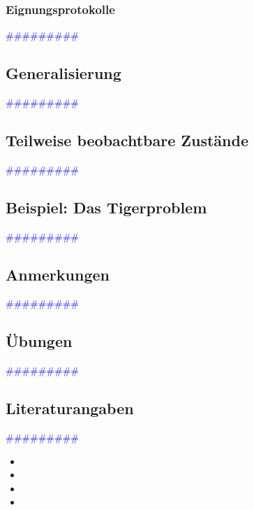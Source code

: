 \documentclass{article}
\begin{document}
    \subsubsection{Eignungsprotokolle} %
      \textcolor{blue}{\#\#\#\#\#\#\#\#\#}
  \subsection{Generalisierung} %
      \textcolor{blue}{\#\#\#\#\#\#\#\#\#}
  \subsection{Teilweise beobachtbare Zustände} %
      \textcolor{blue}{\#\#\#\#\#\#\#\#\#}
  \subsection{Beispiel: Das Tigerproblem} %
      \textcolor{blue}{\#\#\#\#\#\#\#\#\#}
  \subsection{Anmerkungen} %
      \textcolor{blue}{\#\#\#\#\#\#\#\#\#}
  \subsection{Übungen} %
      \textcolor{blue}{\#\#\#\#\#\#\#\#\#}
  \subsection{Literaturangaben} %
      \textcolor{blue}{\#\#\#\#\#\#\#\#\#}

      \begin{itemize}
      \color{red}
        \item
        \item
      \color{ForestGreen}
        \item
        \item
      \end{itemize}
\end{document}
